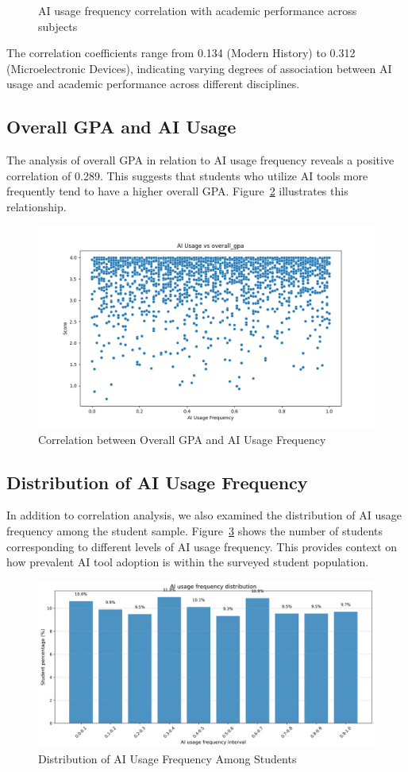\documentclass[manuscript,screen,review]{acmart}
\begin{document}
\begin{figure}[H]
\begin{minipage}{0.3\textwidth}
    \end{minipage}
    
    \caption{AI usage frequency correlation with academic performance across subjects}
    \label{pic}
\end{figure}

The correlation coefficients range from 0.134 (Modern History) to 0.312 (Microelectronic Devices), indicating varying degrees of association between AI usage and academic performance across different disciplines.

\subsection{Overall GPA and AI Usage}

The analysis of overall GPA in relation to AI usage frequency reveals a positive correlation of 0.289. This suggests that students who utilize AI tools more frequently tend to have a higher overall GPA. Figure~\ref{pic2} illustrates this relationship.

\begin{figure}[H]
    \centering
\includegraphics[width=0.5\linewidth]{../results/overall_gpa_ai_correlation.png}
\caption{Correlation between Overall GPA and AI Usage Frequency}
    \label{pic2}
\end{figure}

\subsection{Distribution of AI Usage Frequency}

In addition to correlation analysis, we also examined the distribution of AI usage frequency among the student sample. Figure~\ref{fig:ai_usage_distribution} shows the number of students corresponding to different levels of AI usage frequency. This provides context on how prevalent AI tool adoption is within the surveyed student population.

\begin{figure}[H]
\centering
\includegraphics[width=0.7\linewidth]{../results/ai_usage_distribution.png}
\caption{Distribution of AI Usage Frequency Among Students}
\label{fig:ai_usage_distribution}
\end{figure}
\end{document}
